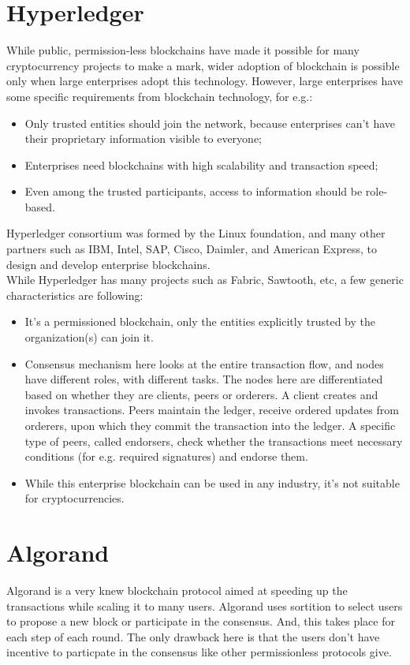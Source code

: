 \section{Hyperledger}
While public, permission-less blockchains have made it possible for many cryptocurrency projects to make a mark, wider adoption of blockchain is possible only when large enterprises adopt this technology. However, large enterprises have some specific requirements from blockchain technology, for e.g.:
\begin{itemize}
    \item Only trusted entities should join the network, because enterprises can’t have their proprietary information visible to everyone;
    \item Enterprises need blockchains with high scalability and transaction speed;
    \item Even among the trusted participants, access to information should be role-based.
\end{itemize}
Hyperledger consortium was formed by the Linux foundation, and many other partners such as IBM, Intel, SAP, Cisco, Daimler, and American Express, to design and develop enterprise blockchains.\\
While Hyperledger has many projects such as Fabric, Sawtooth, etc, a few generic characteristics are following:
\begin{itemize}
    \item It’s a permissioned blockchain, only the entities explicitly trusted by the organization(s) can join it.
    \item Consensus mechanism here looks at the entire transaction flow, and nodes have different roles, with different tasks. The nodes here are differentiated based on whether they are clients, peers or orderers. A client creates and invokes transactions. Peers maintain the ledger, receive ordered updates from orderers, upon which they commit the transaction into the ledger. A specific type of peers, called endorsers, check whether the transactions meet necessary conditions (for e.g. required signatures) and endorse them.
    \item While this enterprise blockchain can be used in any industry, it’s not suitable for cryptocurrencies.
\end{itemize}

\section{Algorand}
Algorand is a very knew blockchain protocol aimed at speeding up the transactions while scaling it to many users. Algorand uses sortition to select users to propose a new block or participate in the consensus. And, this takes place for each step of each round. The only drawback here is that the users don't have incentive to particpate in the consensus like other permissionless protocols give.

